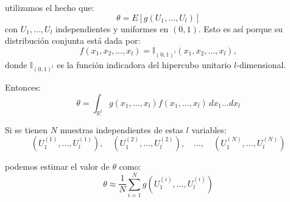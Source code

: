 \documentclass[11pt, a4paper]{article}
\theoremstyle{definition}
\begin{document}
utilizamos el hecho que:
\[
\theta = E[g(U_1, \ldots, U_l)]
\]
con $U_1, \ldots, U_l$ independientes y uniformes en $(0, 1)$. Esto es así porque su distribución conjunta está dada por:
\[
f(x_1, x_2, \ldots, x_l) = \mathbb{I}_{(0, 1)^l}(x_1, x_2, \ldots, x_l),
\]
donde $\mathbb{I}_{(0, 1)^l}$ es la función indicadora del hipercubo unitario $l$-dimensional.

Entonces:
\[
\theta = \int_{\mathbb{R}^l} g(x_1, \ldots, x_l) f(x_1, \ldots, x_l) \, dx_1 \ldots dx_l
\]


Si se tienen $N$ muestras independientes de estas $l$ variables:
\[
(U_1^{(1)}, \ldots, U_l^{(1)}), \quad (U_1^{(2)}, \ldots, U_l^{(2)}), \quad \ldots, \quad (U_1^{(N)}, \ldots, U_l^{(N)})
\]

podemos estimar el valor de $\theta$ como:
\[
\theta \approx \frac{1}{N} \sum_{i=1}^N g(U_1^{(i)}, \ldots, U_l^{(i)})
\]
\end{document}
